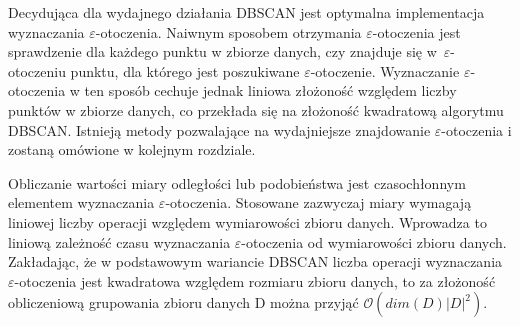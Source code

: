 Decydująca dla wydajnego działania DBSCAN jest optymalna implementacja wyznaczania $ \varepsilon $-otoczenia. Naiwnym sposobem otrzymania $ \varepsilon $-otoczenia jest sprawdzenie dla każdego punktu w zbiorze danych, czy znajduje się \mbox{w $ \varepsilon $-otoczeniu} punktu, dla którego jest poszukiwane $ \varepsilon $-otoczenie. Wyznaczanie $ \varepsilon $-otoczenia w ten sposób cechuje jednak liniowa złożoność względem liczby punktów w zbiorze danych, co przekłada się na złożoność kwadratową algorytmu DBSCAN. Istnieją metody pozwalające na wydajniejsze znajdowanie $ \varepsilon $-otoczenia i zostaną omówione w kolejnym rozdziale.

Obliczanie wartości miary odległości lub podobieństwa jest czasochłonnym elementem wyznaczania $ \varepsilon $-otoczenia. Stosowane zazwyczaj miary wymagają liniowej liczby operacji względem wymiarowości zbioru danych. Wprowadza to liniową zależność czasu wyznaczania $ \varepsilon $-otoczenia od wymiarowości zbioru danych. Zakładając, że w podstawowym wariancie DBSCAN liczba operacji wyznaczania $ \varepsilon $-otoczenia jest kwadratowa względem rozmiaru zbioru danych, to za złożoność obliczeniową grupowania zbioru danych D można przyjąć $ \mathcal{O}(dim(D)|D|^2) $.
